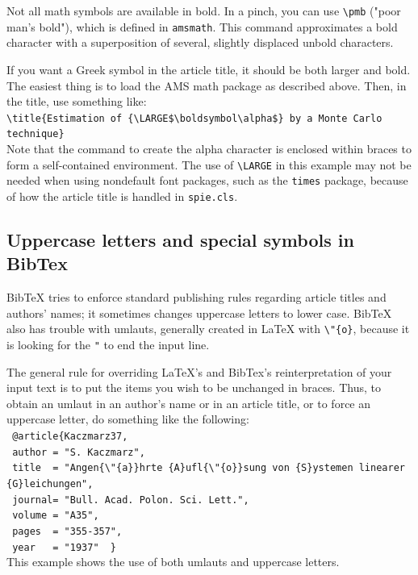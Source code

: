 \documentclass[]{spie}  %
\begin{document}
Not all math symbols are available in bold.  In a pinch, you can use \verb+\pmb+ ("poor man's bold"), which is defined in \verb+amsmath+. This command approximates a bold character with a superposition of several, slightly displaced unbold characters.

If you want a Greek symbol in the article title, it should be both larger and bold. The easiest thing is to load the AMS math package as described above. 
Then, in the title, use something like:\\[1ex]
\verb+\title{Estimation of {\LARGE$\boldsymbol\alpha$} by a Monte Carlo technique}+ \\[1ex]
Note that the command to create the alpha character is enclosed within braces to form a self-contained environment. The use of \verb+\LARGE+ in this example may not be needed when using nondefault font packages, such as the {\tt times} package, because of how the article title is handled in {\tt spie.cls}.

\subsection{Uppercase letters and special symbols in BibTex} 

BibTeX tries to enforce standard publishing rules regarding article titles and authors' names; it sometimes changes uppercase letters to lower case. BibTeX also has trouble with umlauts, generally created in LaTeX with \verb+\"{o}+, because it is looking for the \verb+"+ to end the input line. 

The general rule for overriding LaTeX's and BibTex's reinterpretation of your input text is to put the items you wish to be unchanged in braces. Thus, to obtain an umlaut in an author's name or in an article title, or to force an uppercase letter, do something like the following: \\[1ex]
\verb+ @article{Kaczmarz37,+ \\ 
\verb+ author = "S. Kaczmarz",+ \\ 
\verb+ title  = "Angen{\"{a}}hrte {A}ufl{\"{o}}sung von {S}ystemen linearer {G}leichungen",+ \\ 
\verb+ journal= "Bull. Acad. Polon. Sci. Lett.",+ \\ 
\verb+ volume = "A35",+ \\ 
\verb+ pages  = "355-357",+ \\	
\verb+ year   = "1937"	} + \\[1ex]
This example shows the use of both umlauts and uppercase letters.
\acknowledgments     %
 
\end{document}
